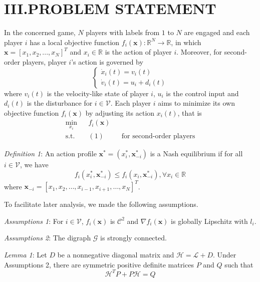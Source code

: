 \documentclass[12pt, a4paper, oneside]{ctexbook}
\begin{document}
\section*{III.\quad PROBLEM STATEMENT}
In the concerned game, $N$ players with labels from $1$ to $N$ are engaged and each player $i$ has a local objective function $f_i(\mathbf{x}):\mathbb{R}^N \rightarrow \mathbb{R}$, in which $\mathbf{x} = [x_1,x_2,...,x_N]^T$ and $x_i \in \mathbb{R}$ is the action of player $i$. Moreover, for second-order players, player $i$'s action is governed by
\begin{equation}
    \begin{cases}
        \dot{x}_i(t)=v_i(t) \\
        \dot{v}_i(t)=u_i+d_i(t)
    \end{cases}
\end{equation}
where $v_i(t)$ is the velocity-like state of player $i$, $u_i$ is the control input and $d_i(t)$ is the disturbance for $i \in \mathcal{V}$. Each player $i$ aims to minimize its own objective function $f_i(\mathbf{x})$ by adjusting its action $x_i(t)$, that is
\begin{equation}
    \begin{aligned}
        \min_{x_i}  &  & f_i(\mathbf{x})                                      \\
        \text{s.t.} &  & (1)             &  & \text{for second-order players}
    \end{aligned}
\end{equation}

\emph{Definition 1}: An action profile $\mathbf{x}^{*}=(x_{i}^{*},\mathbf{x}_{-i}^{*})$ is a Nash equilibrium if for all $i \in \mathcal{V}$, we have
\begin{equation}
    f_i(x_i^*,\mathbf{x}_{-i}^*)\leq f_i(x_i,\mathbf{x}_{-i}^*),\forall x_i\in\mathbb{R}
\end{equation}
where $\mathbf{x}_{-i}=[x_{1},x_{2},\ldots,x_{i-1},x_{i+1},\ldots,x_{N}]^{T}$.

To facilitate later analysis, we made the following assumptions.

\emph{Assumptions 1}: For $i \in \mathcal{V}$, $f_i(\mathbf{x})$ is $\mathcal{C}^2$ and $\nabla f_i(\mathbf{x})$ is globally Lipschitz with $l_i$.

\emph{Assumptions 2}: The digraph $\mathcal{G}$ is strongly connected.

\emph{Lemma 1}: Let $D$ be a nonnegative diagonal matrix and $\mathcal{H} = \mathcal{L} + D$. Under Assumptions 2, there are symmetric positive definite matrices $P$ and $Q$ such that
\begin{equation}
    \mathcal{H}^{T}P+P\mathcal{H}=Q
\end{equation}
\end{document}
